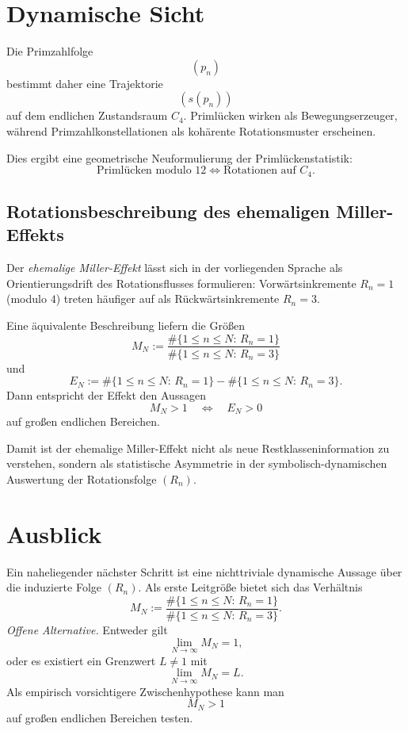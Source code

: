\documentclass[11pt]{article}
\theoremstyle{definition}
\begin{document}
\section{Dynamische Sicht}

Die Primzahlfolge
\[
(p_n)
\]
bestimmt daher eine Trajektorie
\[
(s(p_n))
\]
auf dem endlichen Zustandsraum $C_4$.
Priml\"ucken wirken als Bewegungserzeuger, w\"ahrend Primzahlkonstellationen als koh\"arente Rotationsmuster erscheinen.

Dies ergibt eine geometrische Neuformulierung der Priml\"uckenstatistik:
\[
\boxed{
\text{Priml\"ucken modulo }12
\Longleftrightarrow
\text{Rotationen auf }C_4.
}
\]

\subsection*{Rotationsbeschreibung des ehemaligen Miller-Effekts}

Der \emph{ehemalige Miller-Effekt} l\"asst sich in der vorliegenden Sprache als
Orientierungsdrift des Rotationsflusses formulieren:
Vorw\"artsinkremente $R_n=1$ (modulo $4$) treten h\"aufiger auf als
R\"uckw\"artsinkremente $R_n=3$.

Eine \"aquivalente Beschreibung liefern die Gr\"o{\ss}en
\[
M_N:=\frac{\#\{1\le n\le N:\,R_n=1\}}{\#\{1\le n\le N:\,R_n=3\}}
\]
und
\[
E_N:=\#\{1\le n\le N:\,R_n=1\}-\#\{1\le n\le N:\,R_n=3\}.
\]
Dann entspricht der Effekt den Aussagen
\[
M_N>1
\quad\Longleftrightarrow\quad
E_N>0
\]
auf gro{\ss}en endlichen Bereichen.

Damit ist der ehemalige Miller-Effekt nicht als neue Restklasseninformation zu
verstehen, sondern als statistische Asymmetrie in der symbolisch-dynamischen
Auswertung der Rotationsfolge $(R_n)$.

\section{Ausblick}

Ein naheliegender n\"achster Schritt ist eine nichttriviale dynamische Aussage \"uber die induzierte Folge $(R_n)$. Als erste Leitgr\"o{\ss}e bietet sich das Verh\"altnis
\[
M_N
:=
\frac{\#\{1\le n\le N:\,R_n=1\}}
{\#\{1\le n\le N:\,R_n=3\}}.
\]
\emph{Offene Alternative.} Entweder gilt
\[
\lim_{N\to\infty} M_N = 1,
\]
oder es existiert ein Grenzwert $L\neq1$ mit
\[
\lim_{N\to\infty} M_N = L.
\]
Als empirisch vorsichtigere Zwischenhypothese kann man
\[
M_N>1
\]
auf gro{\ss}en endlichen Bereichen testen.
\end{document}
